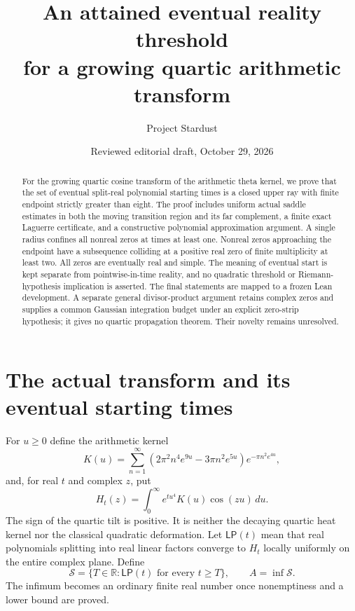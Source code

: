 \documentclass[11pt]{article}
\title{An attained eventual reality threshold\protect\\
for a growing quartic arithmetic transform}
\author{Project Stardust}
\date{Reviewed editorial draft, October 29, 2026}
\theoremstyle{remark}\newtheorem{remark}[theorem]{Remark}
\newcommand{\R}{\mathbb R}\newcommand{\C}{\mathbb C}
\begin{document}
\maketitle
\begin{abstract}
For the growing quartic cosine transform of the arithmetic
theta kernel, we prove that the set of eventual split-real
polynomial starting times is a closed upper ray with finite
endpoint strictly greater than eight. The proof includes
uniform actual saddle estimates in both the moving transition
region and its far complement, a finite exact Laguerre
certificate, and a constructive polynomial approximation
argument. A single radius confines all nonreal zeros at times
at least one. Nonreal zeros approaching the endpoint have a
subsequence colliding at a positive real zero of finite
multiplicity at least two. All zeros are eventually real and
simple. The meaning of eventual start is kept separate from
pointwise-in-time reality, and no quadratic threshold or
Riemann-hypothesis implication is asserted. The final statements
are mapped to a frozen Lean development. A separate general divisor-product
argument retains complex zeros and supplies a common Gaussian integration
budget under an explicit zero-strip hypothesis; it gives no quartic
propagation theorem. Their novelty remains
unresolved.
\end{abstract}

\section{The actual transform and its eventual starting times}
For $u\geq0$ define the arithmetic kernel
\begin{equation}\label{eq:K}
 K(u)=\sum_{n=1}^{\infty}
 (2\pi^2n^4e^{9u}-3\pi n^2e^{5u})e^{-\pi n^2e^{4u}},
\end{equation}
and, for real $t$ and complex $z$, put
\begin{equation}\label{eq:H}
 H_t(z)=\int_0^\infty e^{tu^4}K(u)\cos(zu)\,du.
\end{equation}
The sign of the quartic tilt is positive. It is neither the
decaying quartic heat kernel nor the classical quadratic
deformation. Let $\mathsf{LP}(t)$ mean that real polynomials
splitting into real linear factors converge to $H_t$ locally
uniformly on the entire complex plane. Define
\begin{equation}\label{eq:starts}
 \mathcal S=\{T\in\R:\mathsf{LP}(t)\text{ for every }t\geq T\},
 \qquad A=\inf\mathcal S.
\end{equation}
The infimum becomes an ordinary finite real number once
nonemptiness and a lower bound are proved.
\end{document}
